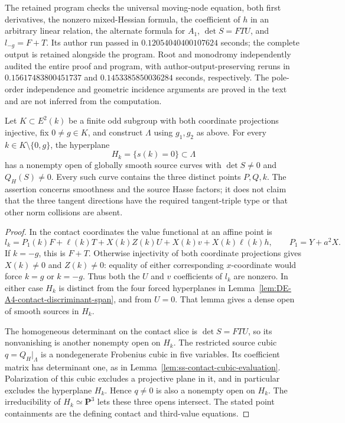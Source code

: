 \begin{remark}
\label{rem:DE-A4-third-value-checks}
The retained program
checks the universal moving-node equation, both first derivatives,
the nonzero mixed-Hessian formula, the coefficient of $h$ in an
arbitrary linear relation, the alternate formula for $A_1$,
$\det S=FTU$, and $l_{-g}=F+T$.
Its author run passed in $0.12054040400107624$ seconds; the complete
output is retained alongside the program.
Root and monodromy independently audited the entire proof and program,
with author-output-preserving reruns in $0.15617483800451737$ and
$0.1453385850036284$ seconds, respectively.
The pole-order independence and geometric incidence arguments are
proved in the text and are not inferred from the computation.
\end{remark}

\begin{corollary}
\label{cor:DE-A4-third-value-smooth}
Let $K\subset E^2(k)$ be a finite odd subgroup with both coordinate
projections injective, fix $0\ne g\in K$, and construct $\Lambda$
using $g_1,g_2$ as above.
For every $k\in K\setminus\{0,g\}$, the hyperplane
\[
                         H_k=\{s(k)=0\}\subset\Lambda
\]
has a nonempty open of globally smooth source curves with
$\det S\ne0$ and $Q_H(S)\ne0$.
Every such curve contains the three distinct points $P,Q,k$.
The assertion concerns smoothness and the source Hasse factors;
it does not claim that the three tangent directions have the
required tangent-triple type or that other norm collisions are absent.
\end{corollary}
\begin{proof}
In the contact coordinates the value functional at an affine point is
\[
      l_k=P_1(k)F+\ell(k)T+X(k)Z(k)U
                     +X(k)v+X(k)\ell(k)h,
      \qquad P_1=Y+a^2X.
\]
If $k=-g$, this is $F+T$.
Otherwise injectivity of both coordinate projections gives
$X(k)\ne0$ and $Z(k)\ne0$: equality of either corresponding
$x$-coordinate would force $k=g$ or $k=-g$.
Thus both the $U$ and $v$ coefficients of $l_k$ are nonzero.
In either case $H_k$ is distinct from the four forced hyperplanes
in Lemma~\ref{lem:DE-A4-contact-discriminant-span}, and from $U=0$.
That lemma gives a dense open of smooth sources in $H_k$.

The homogeneous determinant on the contact slice is
$\det S=FTU$, so its nonvanishing is another nonempty open on $H_k$.
The restricted source cubic $q=Q_H|_\Lambda$ is a nondegenerate
Frobenius cubic in five variables.  Its coefficient matrix has
determinant one, as in
Lemma~\ref{lem:ss-contact-cubic-evaluation}.
Polarization of this cubic excludes a projective plane in it,
and in particular excludes the hyperplane $H_k$.
Hence $q\ne0$ is also a nonempty open on $H_k$.
The irreducibility of $H_k\simeq\mathbf P^3$ lets these three opens
intersect.  The stated point containments are the defining contact
and third-value equations.
\end{proof}


